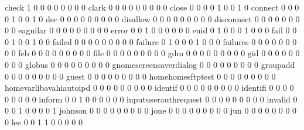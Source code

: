 \documentclass[compress,8pt]{beamer}
\begin{document}
\begin{frame}
\begin{Schunk}
  check                                      1   0   0   0   0   0   0   0   0
  clark                                      0   0   0   0   0   0   0   0   0
  close                                      0   0   0   0   1   0   0   1   0
  connect                                    0   0   0   0   1   0   0   1   0
  dec                                        0   0   0   0   0   0   0   0   0
  disallow                                   0   0   0   0   0   0   0   0   0
  disconnect                                 0   0   0   0   0   0   0   0   0
  eaguilar                                   0   0   0   0   0   0   0   0   0
  error                                      0   0   1   0   0   0   0   0   0
  euid                                       0   1   0   0   0   1   0   0   0
  fail                                       0   0   0   1   0   0   1   0   0
  failed                                     0   0   0   0   0   0   0   0   0
  failure                                    0   1   0   0   0   1   0   0   0
  failures                                   0   0   0   0   0   0   0   0   0
  feb                                        0   0   0   0   0   0   0   0   0
  file                                       0   0   0   0   0   0   0   0   0
  gdm                                        0   0   0   0   0   0   0   0   0
  gid                                        0   0   0   0   0   0   0   0   0
  globus                                     0   0   0   0   0   0   0   0   0
  gnomescreensaverdialog                     0   0   0   0   0   0   0   0   0
  groupadd                                   0   0   0   0   0   0   0   0   0
  guest                                      0   0   0   0   0   0   0   0   0
  homehomesftptest                           0   0   0   0   0   0   0   0   0
  homevarlibavahiautoipd                     0   0   0   0   0   0   0   0   0
  identif                                    0   0   0   0   0   0   0   0   0
  identifi                                   0   0   0   0   0   0   0   0   0
  inform                                     0   0   1   0   0   0   0   0   0
  inputuserauthrequest                       0   0   0   0   0   0   0   0   0
  invalid                                    0   0   0   1   0   0   0   0   1
  johnson                                    0   0   0   0   0   0   0   0   0
  jone                                       0   0   0   0   0   0   0   0   0
  jun                                        0   0   0   0   0   0   0   0   0
  lee                                        0   0   1   1   0   0   0   0   0

\end{Schunk}
\end{frame}
\end{document}
